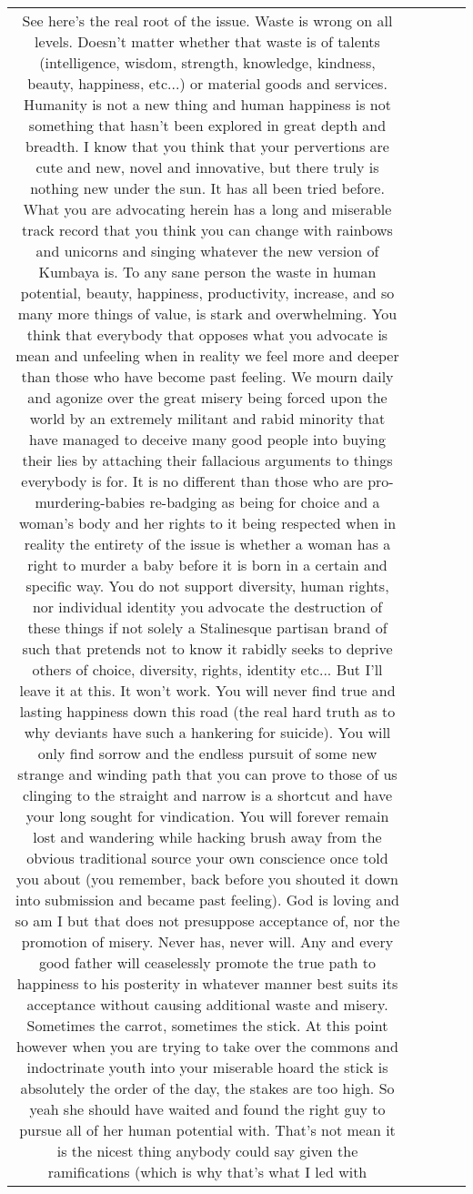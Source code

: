 \documentclass[11pt]{article}
\newlength\mylength
\begin{document}
\begin{center}
\begin{longtable}{|C{.40\mylength}|C{.30\mylength}|C{.15\mylength}|C{.15\mylength}|C{.15\mylength}|}
  See here's the real root of the issue. Waste is wrong on all levels. Doesn't matter whether that waste is of talents  (intelligence, wisdom, strength, knowledge, kindness, beauty, happiness, etc...) or material goods and services. Humanity is not a new thing and human happiness is not something that hasn't been explored in great depth and breadth. I know that you think that your pervertions are cute and new, novel and innovative, but there truly is nothing new under the sun. It has all been tried before. What you are advocating herein has a long and miserable track record that you think you can change with rainbows and unicorns and singing whatever the new version of Kumbaya is.  To any sane person the waste in human potential, beauty, happiness, productivity, increase, and so many more things of value, is stark and overwhelming. You think that everybody that opposes what you advocate is mean and unfeeling when in reality we feel more and deeper than those who have become past feeling. We mourn daily and agonize over the great misery being forced upon the world by an extremely militant and rabid minority that have managed to deceive many good people into buying their lies by attaching their fallacious arguments to things everybody is for. It is no different than those who are pro-murdering-babies re-badging as being for choice and a woman's body and her rights to it being respected when in reality the entirety of the issue is whether a woman has a right to murder a baby before it is born in a certain and specific way. You do not support diversity, human rights, nor individual identity you advocate the destruction of these things if not solely a Stalinesque partisan brand of such that pretends not to know it rabidly seeks to deprive others of choice, diversity, rights, identity etc...  But I'll leave it at this. It won't work. You will never find true and lasting happiness down this road (the real hard truth as to why deviants have such a hankering for suicide). You will only find sorrow and the endless pursuit of some new strange and winding path that you can prove to those of us clinging to the straight and narrow is a shortcut and have your long sought for vindication. You will forever remain lost and wandering while hacking brush away from the obvious traditional source your own conscience once told you about (you remember, back before you shouted it down into submission and became past feeling).  God is loving and so am I but that does not presuppose acceptance of, nor the promotion of misery. Never has, never will. Any and every good father will ceaselessly promote the true path to happiness to his posterity in whatever manner best suits its acceptance without causing additional waste and misery. Sometimes the carrot, sometimes the stick. At this point however when you are trying to take over the commons and indoctrinate youth into your miserable hoard the stick is absolutely the order of the day, the stakes are too high.  So yeah she should have waited and found the right guy to pursue all of her human potential with. That's not mean it is the nicest thing anybody could say given the ramifications (which is why that's what I led with 
\end{longtable}
\end{center}
\end{document}
